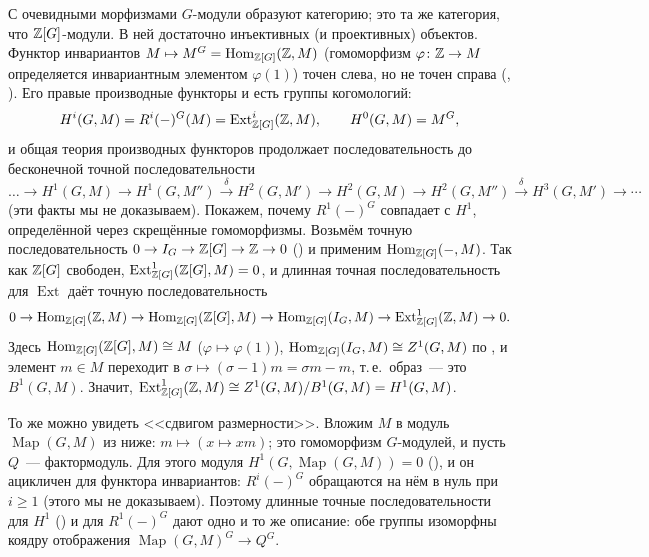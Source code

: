 \begin{aside}[5.26]
С очевидными морфизмами $G$-модули образуют категорию; это та же категория, что $\mathbb Z[G]$-модули. В ней достаточно
инъективных (и проективных) объектов. Функтор инвариантов $M\mapsto M^G=\operatorname{Hom}_{\mathbb Z[G]}(\mathbb Z,M)$ (гомоморфизм $\varphi\colon\mathbb Z\to
M$ определяется инвариантным элементом $\varphi(1)$) точен слева, но не точен справа (, ). Его
правые производные функторы и есть группы когомологий:
\[
H^i(G,M)=R^i(-)^G(M)=\operatorname{Ext}^i_{\mathbb Z[G]}(\mathbb Z,M),\qquad H^0(G,M)=M^G,
\]
и общая теория производных функторов продолжает последовательность  до бесконечной точной
последовательности
\[
\dots\to H^1(G,M)\to H^1(G,M'')\xrightarrow{\delta}H^2(G,M')\to H^2(G,M)\to H^2(G,M'')\xrightarrow{\delta}H^3(G,M')\to\cdots
\]
(эти факты мы не доказываем). Покажем, почему $R^1(-)^G$ совпадает с $H^1$, определённой через скрещённые гомоморфизмы.
Возьмём точную последовательность $0\to I_G\to\mathbb Z[G]\to\mathbb Z\to0$ () и применим $\operatorname{Hom}_{\mathbb Z[G]}(-,M)$. Так как
$\mathbb Z[G]$ свободен, $\operatorname{Ext}^1_{\mathbb Z[G]}(\mathbb Z[G],M)=0$, и длинная точная последовательность для $\operatorname{Ext}$
даёт точную последовательность
\[
0\to\operatorname{Hom}_{\mathbb Z[G]}(\mathbb Z,M)\to\operatorname{Hom}_{\mathbb Z[G]}(\mathbb Z[G],M)\to\operatorname{Hom}_{\mathbb Z[G]}(I_G,M)\to\operatorname{Ext}^1_{\mathbb Z[G]}(\mathbb Z,M)\to0.
\]
Здесь $\operatorname{Hom}_{\mathbb Z[G]}(\mathbb Z[G],M)\cong M$ ($\varphi\mapsto\varphi(1)$), $\operatorname{Hom}_{\mathbb Z[G]}(I_G,M)\cong Z^1(G,M)$ по
, и элемент $m\in M$ переходит в $\sigma\mapsto(\sigma-1)m=\sigma m-m$, т.\,е.\ образ~--- это $B^1(G,M)$.
Значит, $\operatorname{Ext}^1_{\mathbb Z[G]}(\mathbb Z,M)\cong Z^1(G,M)/B^1(G,M)=H^1(G,M)$.

То же можно увидеть <<сдвигом размерности>>. Вложим $M$ в модуль $\operatorname{Map}(G,M)$ из  ниже:
$m\mapsto(x\mapsto xm)$; это гомоморфизм $G$-модулей, и пусть $Q$~--- фактормодуль. Для этого модуля
$H^1(G,\operatorname{Map}(G,M))=0$ (), и он ацикличен для функтора инвариантов: $R^i(-)^G$ обращаются на нём в
нуль при $i\ge1$ (этого мы не доказываем). Поэтому длинные точные последовательности для $H^1$ () и для
$R^1(-)^G$ дают одно и то же описание: обе группы изоморфны коядру отображения
$\operatorname{Map}(G,M)^G\to Q^G$.
\end{aside}

